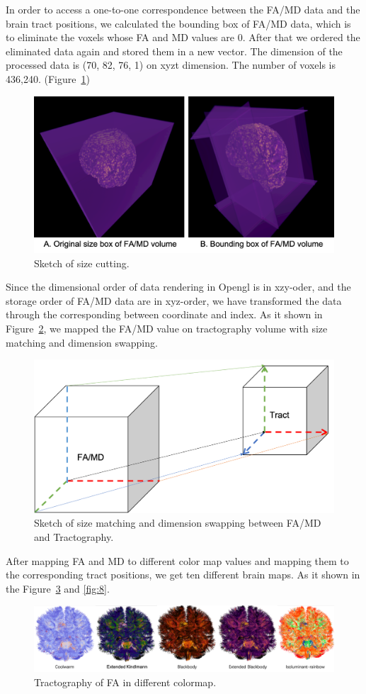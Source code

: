\documentclass[hyperref, plainreport, noproblem]{cgvpub1}
\begin{document}
In order to access a one-to-one correspondence between the FA/MD data and the brain tract positions, we calculated the bounding box of FA/MD data, which is to eliminate the voxels whose FA and MD values are 0. After that we ordered the eliminated data again and stored them in a new vector. The dimension of the processed data is (70, 82, 76, 1) on xyzt dimension. The number of voxels is 436,240. (Figure~\ref{fig:5})

\begin{figure}[ht]
    \centering
    \includegraphics[width = 0.8\columnwidth]{5}
    \caption{Sketch of size cutting.}
    \label{fig:5}
\end{figure}	


Since the dimensional order of data rendering in Opengl is in xzy-oder, and the storage order of FA/MD data are in xyz-order, we have transformed the data through the corresponding between coordinate and index. As it shown in Figure~\ref{fig:6}, we mapped the FA/MD value on tractography volume with size matching and dimension swapping.

\begin{figure}[ht]
    \centering
    \includegraphics[width = 0.6\columnwidth]{6}
    \caption{Sketch of size matching and dimension swapping between FA/MD and Tractography.}
    \label{fig:6}
\end{figure}	

After mapping FA and MD to different color map values and mapping them to the corresponding tract positions, we get ten different brain maps. As it shown in the Figure~\ref{fig:7} and \ref{fig:8}.
\clearpage
\begin{figure}[ht]
    \centering
    \includegraphics[width = 0.9\columnwidth]{7}
    \caption{Tractography of FA in different colormap.}
    \label{fig:7}
\end{figure}
\end{document}
